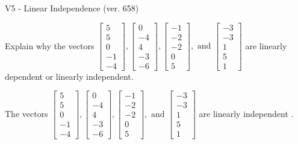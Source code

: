 \begin{exercise}
  \begin{exerciseTitle}V5 - Linear Independence (ver. 658)\end{exerciseTitle}
  \begin{exerciseStatement}
    Explain why the vectors \(\left[\begin{array}{r}
5 \\
5 \\
0 \\
-1 \\
-4
\end{array}\right] , \left[\begin{array}{r}
0 \\
-4 \\
4 \\
-3 \\
-6
\end{array}\right] , \left[\begin{array}{r}
-1 \\
-2 \\
-2 \\
0 \\
5
\end{array}\right] , \text{ and } \left[\begin{array}{r}
-3 \\
-3 \\
1 \\
5 \\
1
\end{array}\right]\) are linearly dependent or linearly independent.	


  \end{exerciseStatement}
  \begin{exerciseAnswer}
   The vectors \(\left[\begin{array}{r}
5 \\
5 \\
0 \\
-1 \\
-4
\end{array}\right] , \left[\begin{array}{r}
0 \\
-4 \\
4 \\
-3 \\
-6
\end{array}\right] , \left[\begin{array}{r}
-1 \\
-2 \\
-2 \\
0 \\
5
\end{array}\right] , \text{ and } \left[\begin{array}{r}
-3 \\
-3 \\
1 \\
5 \\
1
\end{array}\right]\) are 
  	 linearly independent  .
  


  \end{exerciseAnswer}
\end{exercise}